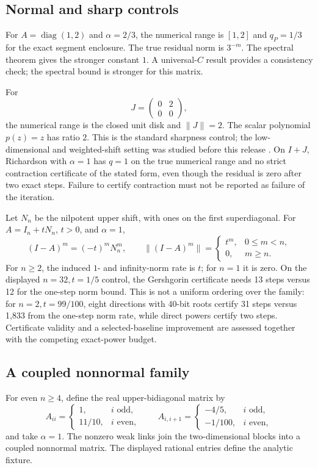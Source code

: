\documentclass[11pt]{article}
\newcommand{\norm}[1]{\lVert #1\rVert}
\DeclareMathOperator{\diag}{diag}
\theoremstyle{definition}
\theoremstyle{remark}
\numberwithin{equation}{section}
\begin{document}
\subsection{Normal and sharp controls}
For \(A=\diag(1,2)\) and \(\alpha=2/3\), the numerical range is
\([1,2]\) and \(q_P=1/3\) for the exact segment enclosure.
The true residual norm is \(3^{-m}\).
The spectral theorem gives the stronger constant \(1\).
A universal-\(C\) result provides a consistency check; the spectral
bound is stronger for this matrix.

For
\[
 J=\begin{pmatrix}0&2\\0&0\end{pmatrix},
\]
the numerical range is the closed unit disk and \(\norm{J}=2\).
The scalar polynomial \(p(z)=z\) has ratio \(2\).
This is the standard sharpness control; the low-dimensional and
weighted-shift setting was studied before this release
\citep{CrouzeixGreenbaum2025}.
On \(I+J\), Richardson with \(\alpha=1\) has \(q=1\) on the true
numerical range and no strict contraction certificate of the stated form,
even though the residual is zero after two exact steps.
Failure to certify contraction must not be reported as failure of the
iteration.

Let \(N_n\) be the nilpotent upper shift, with ones on the first
superdiagonal.
For \(A=I_n+tN_n\), \(t>0\), and \(\alpha=1\),
\[
 (I-A)^m=(-t)^mN_n^m,\qquad
 \norm{(I-A)^m}=
 \begin{cases}
 t^m,&0\le m<n,\\
 0,&m\ge n.
 \end{cases}
\]
For \(n\ge2\), the induced \(1\)- and infinity-norm rate is \(t\);
for \(n=1\) it is zero. On the displayed \(n=32,t=1/5\) control,
the Gershgorin certificate needs 13 steps versus 12 for the one-step
norm bound. This is not a uniform ordering over the family: for
\(n=2,t=99/100\), eight directions with 40-bit roots certify 31
steps versus 1,833 from the one-step norm rate, while direct powers
certify two steps. Certificate validity and a selected-baseline
improvement are assessed together with the competing exact-power budget.

\subsection{A coupled nonnormal family}\label{sec:coupled}
For even \(n\ge4\), define the real upper-bidiagonal matrix by
\[
 A_{ii}=
 \begin{cases}1,&i\text{ odd},\\11/10,&i\text{ even},\end{cases}
 \qquad
 A_{i,i+1}=
 \begin{cases}-4/5,&i\text{ odd},\\-1/100,&i\text{ even},\end{cases}
\]
and take \(\alpha=1\).
The nonzero weak links join the two-dimensional blocks into a coupled
nonnormal matrix. The displayed rational entries define the analytic fixture.
\end{document}
